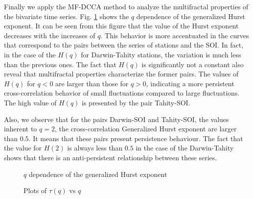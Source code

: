 \documentclass[onecolumn, preprint,aps,amsmath, amssymb, superscriptaddress]{revtex4}
\begin{document}
Finally we apply the MF-DCCA method to analyze the multifractal properties of the bivariate time series. Fig. \ref{fig:mfdcca_H} shows the $q$ dependence of the generalized Hurst exponent. It can be seen from this figure that the value of the Hurst exponent decreases with the increases of $q$. This behavior is more accentuated in the curves that correspond to the pairs between the series of stations and the SOI. In fact, in the case of the $H(q)$ for Darwin-Tahity stations, the variation is much less than the previous ones. The fact that $H
(q)$ is significantly not a constant also reveal that multifractal properties characterize the former pairs. The values of $H(q)$ for $q < 0$ are larger than those for $q > 0$, indicating a more persistent cross-correlation behavior of
small fluctuations compared to large fluctuations. The high value of $H(q)$ is presented by the pair Tahity-SOI.

Also, we observe that for the pairs Darwin-SOI and Tahity-SOI, the values inherent to $q = 2$, the cross-correlation Generalized Hurst exponent are larger than $0.5$. It means that these pairs present persistence behaviour. The fact that the value for $H(2 )$ is always less than $0.5$ in the case of the Darwin-Tahity shows that there is an anti-persistent relationship between these series.

\begin{figure}
\caption{$q$ dependence of the generalized Hurst exponent}
\label{fig:mfdcca_H}
\end{figure}

\begin{figure}
\caption{Plots of $\tau(q)$ vs $q$}
\label{fig:mfdcca_tau}
\end{figure}
\end{document}
